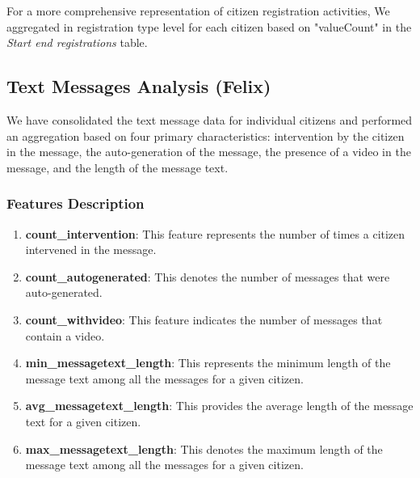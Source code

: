 \documentclass[12pt]{article}
\begin{document}
For a more comprehensive representation of citizen registration activities, 
We aggregated in registration type level for each citizen based on "valueCount"  
in the \textit{Start end registrations} table.


\subsection{Text Messages Analysis (Felix)}

We have consolidated the text message data for individual citizens and performed an aggregation based on four primary characteristics: intervention by the citizen in the message, the auto-generation of the message, the presence of a video in the message, and the length of the message text.

\subsubsection{Features Description}

\begin{enumerate}
    \item \textbf{count\_intervention}: This feature represents the number of times a citizen intervened in the message.
    
    \item \textbf{count\_autogenerated}: This denotes the number of messages that were auto-generated.
    
    \item \textbf{count\_withvideo}: This feature indicates the number of messages that contain a video.
    
    \item \textbf{min\_messagetext\_length}: This represents the minimum length of the message text among all the messages for a given citizen.
    
    \item \textbf{avg\_messagetext\_length}: This provides the average length of the message text for a given citizen.
    
    \item \textbf{max\_messagetext\_length}: This denotes the maximum length of the message text among all the messages for a given citizen.
\end{enumerate}
\end{document}
